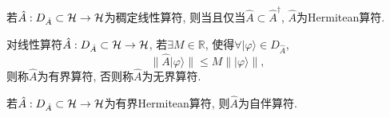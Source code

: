 \begin{definition}
    若$\hat{A}: D_{\hat{A}}\subset\mathcal{H}\to\mathcal{H}$为稠定线性算符, 则当且仅当$\hat{A}\subset \hat{A}^{\dagger}$, $\hat{A}$为Hermitean算符.
\end{definition}

\begin{definition}
    对线性算符$\hat{A}: D_{\hat{A}}\subset\mathcal{H}\to\mathcal{H}$, 若$\exists M\in\mathbb{R} $, 使得$\forall|\varphi\rangle\in D_{\hat{A}}$,
    \begin{equation*}
        \lVert \hat{A}|\varphi\rangle\rVert 
        \le
        M \lVert |\varphi\rangle\rVert,
    \end{equation*}
    则称$\hat{A}$为有界算符, 否则称$\hat{A}$为无界算符.
\end{definition}

\begin{definition}
    若$\hat{A}: D_{\hat{A}}\subset\mathcal{H}\to\mathcal{H}$为有界Hermitean算符, 则$\hat{A}$为自伴算符.
\end{definition}
